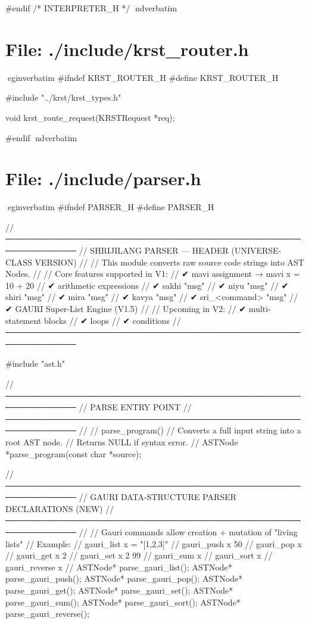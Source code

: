 \documentclass{article}
\begin{document}
#endif /* INTERPRETER_H */
nd{verbatim}
\section*{File: ./include/krst_router.h}
egin{verbatim}
#ifndef KRST_ROUTER_H
#define KRST_ROUTER_H

#include "../krst/krst_types.h"

void krst_route_request(KRSTRequest *req);

#endif
nd{verbatim}
\section*{File: ./include/parser.h}
egin{verbatim}
#ifndef PARSER_H
#define PARSER_H

//──────────────────────────────────────────────────────────────
//  SHRIJILANG PARSER — HEADER (UNIVERSE-CLASS VERSION)
//
//  This module converts raw source code strings into AST Nodes.
//  
//  Core features supported in V1:
//    ✔ mavi assignment       → mavi x = 10 + 20
//    ✔ arithmetic expressions
//    ✔ sakhi "msg"
//    ✔ niyu "msg"
//    ✔ shiri "msg"
//    ✔ mira "msg"
//    ✔ kavya "msg"
//    ✔ sri_<command> "msg"
//    ✔ GAURI Super-List Engine (V1.5)
//
//  Upcoming in V2:
//    ✔ multi-statement blocks { }
//    ✔ loops
//    ✔ conditions
//──────────────────────────────────────────────────────────────

#include "ast.h"

//──────────────────────────────────────────────────────────────
//  PARSE ENTRY POINT
//──────────────────────────────────────────────────────────────
//
//  parse_program()
//      Converts a full input string into a root AST node.
//      Returns NULL if syntax error.
//
ASTNode *parse_program(const char *source);


//──────────────────────────────────────────────────────────────
//  GAURI DATA-STRUCTURE PARSER DECLARATIONS (NEW)
//──────────────────────────────────────────────────────────────
//
//  Gauri commands allow creation + mutation of "living lists"
//  Example:
//      gauri_list x = "[1,2,3]"
//      gauri_push x 50
//      gauri_pop x
//      gauri_get x 2
//      gauri_set x 2 99
//      gauri_sum x
//      gauri_sort x
//      gauri_reverse x
//
ASTNode* parse_gauri_list();
ASTNode* parse_gauri_push();
ASTNode* parse_gauri_pop();
ASTNode* parse_gauri_get();
ASTNode* parse_gauri_set();
ASTNode* parse_gauri_sum();
ASTNode* parse_gauri_sort();
ASTNode* parse_gauri_reverse();
\end{document}
